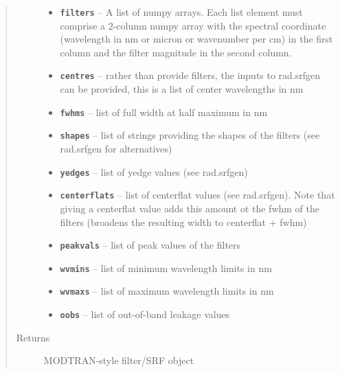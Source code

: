\documentclass[a4paper,10pt,english]{sphinxmanual}
\begin{document}
\begin{fulllineitems}
\begin{quote}
\begin{description}
\begin{itemize}
\item {} 
\textbf{\texttt{filters}} -- A list of numpy arrays. Each list element must comprise a 2-column numpy array with the
spectral coordinate (wavelength in nm or micron or wavenumber per cm) in the first column and the filter
magnitude in the second column.

\item {} 
\textbf{\texttt{centres}} -- rather than provide filters, the inputs to rad.srfgen can be provided, this is a list of center
wavelengths in nm

\item {} 
\textbf{\texttt{fwhms}} -- list of full width at half maximum in nm

\item {} 
\textbf{\texttt{shapes}} -- list of strings providing the shapes of the filters (see rad.srfgen for alternatives)

\item {} 
\textbf{\texttt{yedges}} -- list of yedge values (see rad.srfgen)

\item {} 
\textbf{\texttt{centerflats}} -- list of centerflat values (see rad.srfgen). Note that giving a centerflat value adds this
amount ot the fwhm of the filters (broadens the resulting width to centerflat + fwhm)

\item {} 
\textbf{\texttt{peakvals}} -- list of peak values of the filters

\item {} 
\textbf{\texttt{wvmins}} -- list of minimum wavelength limits in nm

\item {} 
\textbf{\texttt{wvmaxs}} -- list of maximum wavelength limits in nm

\item {} 
\textbf{\texttt{oobs}} -- list of out-of-band leakage values

\end{itemize}

\item[{Returns}] \leavevmode
MODTRAN-style filter/SRF object

\end{description}\end{quote}


\end{fulllineitems}
\end{document}
